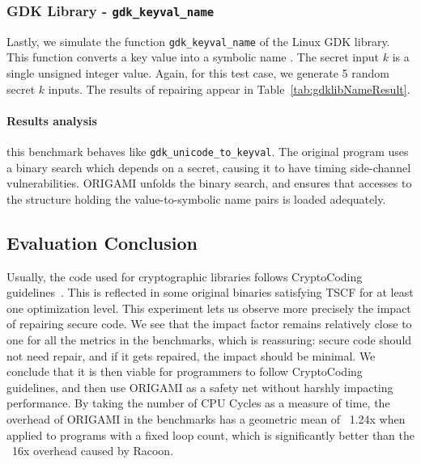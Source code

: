\subsubsection{GDK Library - \texttt{gdk\_keyval\_name}}
Lastly, we simulate the function \texttt{gdk\_keyval\_name} of the Linux GDK library. This function converts a key value into a symbolic name \cite{gdklib}. The secret input $k$ is a single unsigned integer value. 
Again, for this test case, we generate 5 random secret $k$ inputs. The results of repairing appear in Table~\ref{tab:gdklibNameResult}. 

\paragraph*{Results analysis} this benchmark behaves like \texttt{gdk\_unicode\_to\_keyval}. 
The original program uses a binary search which depends on a secret, causing it to have timing side-channel vulnerabilities. ORIGAMI unfolds the binary search, and ensures that accesses to the structure holding the value-to-symbolic name pairs is loaded adequately. 

\subsection{Evaluation Conclusion} %

Usually, the code used for cryptographic libraries follows CryptoCoding guidelines~\cite{CryptoCoding}. This is reflected in some original binaries satisfying TSCF for at least one optimization level. This experiment lets us observe more precisely the impact of repairing secure code. We see that the impact factor remains relatively close to one for all the metrics in the benchmarks, which is reassuring: secure code should not need repair, and if it gets repaired, the impact should be minimal. We conclude that it is then viable for programmers to follow CryptoCoding guidelines, and then use ORIGAMI as a safety net without harshly impacting performance. By taking the number of CPU Cycles as a measure of time, the overhead of ORIGAMI in the benchmarks has a geometric mean of ~1.24x when applied to programs with a fixed loop count, which is significantly better than the ~16x overhead caused by Racoon. 

